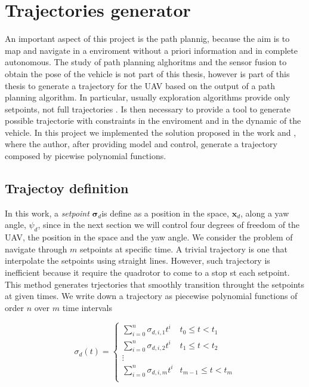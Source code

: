\chapter{Trajectories generator}
\label{trajectoriesGenerator}

An important aspect of this project is the path plannig, because the aim is to map and navigate in a enviroment without a priori information and in complete autonomous. The study of path planning alghoritms and the sensor fusion to obtain the pose of the vehicle is not part of this thesis, however is part of this thesis to generate a trajectory for the UAV based on the output of a path planning algorithm. In particular, usually exploration algorithms provide only setpoints, not full trajectories \cite{potentialField} \cite{visionBasedMAV}. Is then necessary to provide a tool to generate possible trajectorie with constraints in the enviroment and in the dynamic of the vehicle. In this project we implemented the solution proposed in the work \cite{minimumSnap} and \cite{polyTraj}, where the author, after providing model and control, generate a trajectory composed by picewise polynomial functions.


\section{Trajectoy definition}
\label{trajDefinition}

In this work, a \textit{setpoint} $\boldsymbol{\sigma}_d$is define as a position in the space, $\mathbf{x}_d$, along a yaw angle, $\psi_d$, since in the next section we will control four degrees of freedom of the UAV, the position in the space and the yaw angle. We consider the problem of navigate through $m$ setpoints at specific time. A trivial trajectory is one that interpolate the setpoints using straight lines. However, such trajectory is inefficient because it require the quadrotor to come to a stop st each setpoint. This method generates trjectories that smoothly transition throught the setpoints at given times. We write down a trajectory as piecewise polynomial functions of order $n$ over $m$ time intervals

\begin{equation}
	\sigma_d(t)=
	\begin{cases}
		\sum\limits_{i=0}^{n}\sigma_{d,i,1}t^i & t_0 \le t < t_1 \\
		\sum\limits_{i=0}^{n}\sigma_{d,i,2}t^i & t_1 \le t < t_2 \\
		\vdots \\
		\sum\limits_{i=0}^{n}\sigma_{d,i,m}t^i & t_{m-1} \le t < t_m \\
	\end{cases}
	\label{eq:defTraj}
\end{equation}

